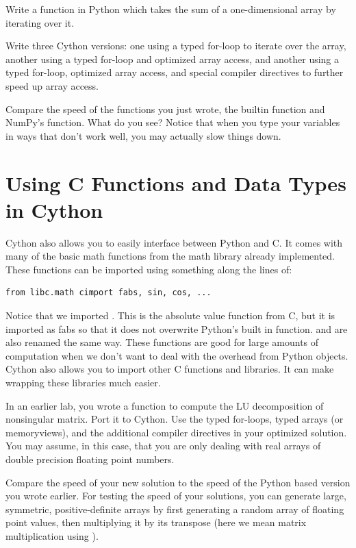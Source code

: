\begin{problem}
Write a function in Python which takes the sum of a one-dimensional array by iterating over it.

Write three Cython versions: one using a typed for-loop to iterate over the array, another using a typed for-loop and optimized array access, and another using a typed for-loop, optimized array access, and special compiler directives to further speed up array access.

Compare the speed of the functions you just wrote, the builtin  function and NumPy's  function.
What do you see?
Notice that when you type your variables in ways that don't work well, you may actually slow things down.
\end{problem}

\section*{Using C Functions and Data Types in Cython}
Cython also allows you to easily interface between Python and C.
It comes with many of the basic math functions from the math library already implemented.
These functions can be imported using something along the lines of:
\begin{lstlisting}
from libc.math cimport fabs, sin, cos, ...
\end{lstlisting}
Notice that we imported .
This is the absolute value function from C, but it is imported as fabs so that it does not overwrite Python's built in  function.
 and  are also renamed the same way.
These functions are good for large amounts of computation when we don't want to deal with the overhead from Python objects.
Cython also allows you to import other C functions and libraries.
It can make wrapping these libraries much easier.

\begin{problem}
In an earlier lab, you wrote a function to compute the LU decomposition of nonsingular matrix.
Port it to Cython.
Use the typed for-loops, typed arrays (or memoryviews), and the additional compiler directives in your optimized solution.
You may assume, in this case, that you are only dealing with real arrays of double precision floating point numbers.

Compare the speed of your new solution to the speed of the Python based version you wrote earlier.
For testing the speed of your solutions, you can generate large, symmetric, positive-definite arrays by first generating a random array of floating point values, then multiplying it by its transpose (here we mean matrix multiplication using ).
\end{problem}

